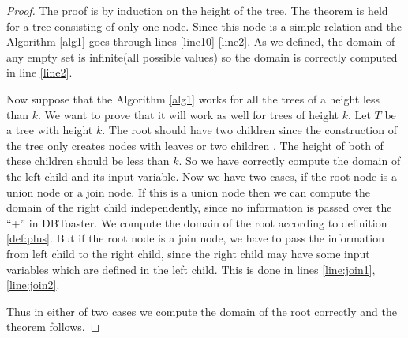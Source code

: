 \documentclass[12pt]{article}
\begin{document}
\begin{proof}

The proof is by induction on the height of the tree. The theorem is held for a tree consisting of only one node. Since this node is a simple relation and the Algorithm \ref{alg1} goes  through lines \ref{line10}-\ref{line2}. As we defined, the domain of any empty set is infinite(all possible values) so the domain is correctly computed in line \ref{line2}.

Now suppose that the Algorithm \ref{alg1} works for all the trees of a height less than $k$. We want to prove that it will work as well for trees of height $k$. Let $T$ be a tree with height $k$. The root should have two children since the construction of the tree only creates nodes with leaves or two children \cite{1}. The height of both of these children should be less than $k$. So we have correctly compute the domain of the left child and its input variable. Now we have two cases, if the root node is a union node or a join node. If this is a union node then we can compute the domain of the right child independently, since no information is passed over the ``+'' in DBToaster\cite{1}. We compute the domain of the root according to definition \eqref{def:plus}. But if the root node is a join node, we have to pass the information from left child to the right child, since the right child may have some input variables which are defined in the left child. This is done in lines \ref{line:join1},\ref{line:join2}.\par
Thus in either of two cases we compute the domain of the root correctly and the theorem follows.
\end{proof}
\end{document}
